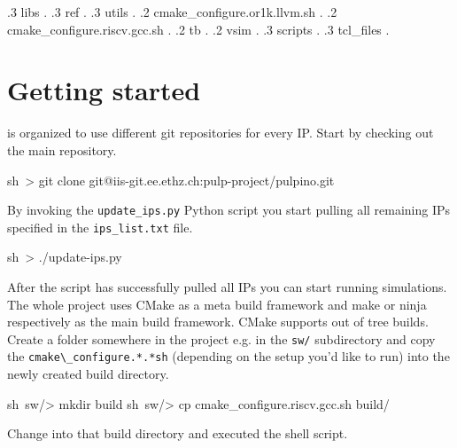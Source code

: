 \begin{flushleft}
{    .3 libs .
    .3 ref .
    .3 utils .
  .2 cmake\_configure.or1k.llvm.sh .
  .2 cmake\_configure.riscv.gcc.sh .
  .2 tb .
  .2 vsim .
    .3 scripts .
    .3 tcl\_files .
}
\end{flushleft}


\section{Getting started}
\label{sec:getting_started}

\pulpino is organized to use different git repositories for every IP. Start by checking out the main repository.

\begin{shellenv}
sh~> git clone git@iis-git.ee.ethz.ch:pulp-project/pulpino.git
\end{shellenv}

By invoking the \verb+update_ips.py+ Python script you start pulling all remaining IPs specified in the \verb+ips_list.txt+ file. 

\begin{shellenv}
sh~> ./update-ips.py
\end{shellenv}


After the script has successfully pulled all IPs you can start running simulations. The whole \pulpino project uses CMake as a meta build framework and make or ninja respectively as the main build framework. CMake supports out of tree builds. Create a folder somewhere in the project e.g. in the \verb+sw/+ subdirectory and copy the \verb+cmake\_configure.*.*sh+ (depending on the setup you'd like to run) into the newly created build directory.

\begin{shellenv}
sh~sw/> mkdir build
sh~sw/> cp cmake_configure.riscv.gcc.sh build/
\end{shellenv}

Change into that build directory and executed the shell script.

